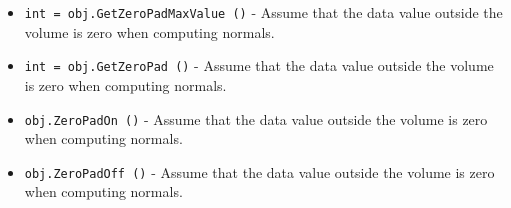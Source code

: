 \begin{itemize}
\item  \verb|int = obj.GetZeroPadMaxValue ()| -  Assume that the data value outside the volume is zero when
 computing normals.

\item  \verb|int = obj.GetZeroPad ()| -  Assume that the data value outside the volume is zero when
 computing normals.

\item  \verb|obj.ZeroPadOn ()| -  Assume that the data value outside the volume is zero when
 computing normals.

\item  \verb|obj.ZeroPadOff ()| -  Assume that the data value outside the volume is zero when
 computing normals.

\end{itemize}
